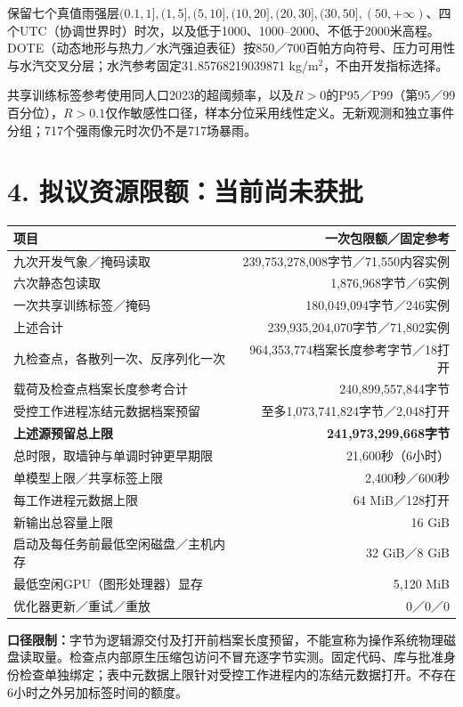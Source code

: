 \documentclass[UTF8,a4paper,10pt,fontset=none]{ctexart}
\begin{document}
保留七个真值雨强层$(0.1,1],(1,5],(5,10],(10,20],(20,30],(30,50],(50,+\infty)$、四个UTC（协调世界时）时次，以及低于1000、1000--2000、不低于2000米高程。DOTE（动态地形与热力／水汽强迫表征）按850／700百帕方向符号、压力可用性与水汽交叉分层；水汽参考固定31.85768219039871 kg/m$^2$，不由开发指标选择。

共享训练标签参考使用同人口2023的超阈频率，以及$R>0$的P95／P99（第95／99百分位），$R>0.1$仅作敏感性口径，样本分位采用线性定义。无新观测和独立事件分组；717个强雨像元时次仍不是717场暴雨。

\newpage
\section*{4. 拟议资源限额：当前尚未获批}
\begin{center}\small
\begin{tabularx}{\linewidth}{@{}Xr@{}}
\toprule
项目 & 一次包限额／固定参考\\
\midrule
九次开发气象／掩码读取 & 239,753,278,008字节／71,550内容实例\\
六次静态包读取 & 1,876,968字节／6实例\\
一次共享训练标签／掩码 & 180,049,094字节／246实例\\
上述合计 & 239,935,204,070字节／71,802实例\\
九检查点，各散列一次、反序列化一次 & 964,353,774档案长度参考字节／18打开\\
载荷及检查点档案长度参考合计 & 240,899,557,844字节\\
受控工作进程冻结元数据档案预留 & 至多1,073,741,824字节／2,048打开\\
\textbf{上述源预留总上限} & \textbf{241,973,299,668字节}\\
\midrule
总时限，取墙钟与单调时钟更早期限 & 21,600秒（6小时）\\
单模型上限／共享标签上限 & 2,400秒／600秒\\
每工作进程元数据上限 & 64 MiB／128打开\\
新输出总容量上限 & 16 GiB\\
启动及每任务前最低空闲磁盘／主机内存 & 32 GiB／8 GiB\\
最低空闲GPU（图形处理器）显存 & 5,120 MiB\\
优化器更新／重试／重放 & 0／0／0\\
\bottomrule
\end{tabularx}
\end{center}

\textbf{口径限制：}字节为逻辑源交付及打开前档案长度预留，不能宣称为操作系统物理磁盘读取量。检查点内部原生压缩包访问不冒充逐字节实测。固定代码、库与批准身份检查单独绑定；表中元数据上限针对受控工作进程内的冻结元数据打开。不存在6小时之外另加标签时间的额度。
\end{document}
